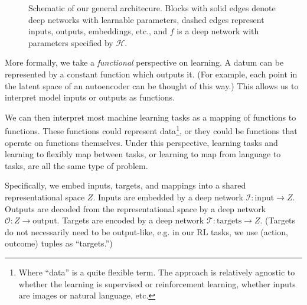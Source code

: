 \documentclass{article}
\begin{document}
\begin{figure}
\caption{Schematic of our general architecure. Blocks with solid edges denote deep networks with learnable parameters, dashed edges represent inputs, outputs, embeddings, etc., and $f$ is a deep network with parameters specified by $\mathcal{H}$.} \label{architecture_fig}
\end{figure}
More formally, we take a \emph{functional} perspective on learning. A datum can be represented by a constant function which outputs it. (For example, each point in the latent space of an autoencoder can be thought of this way.) This allows us to interpret model inputs or outputs as functions. \par
We can then interpret most machine learning tasks as a mapping of functions to functions. These functions could represent data\footnote{Where ``data'' is a quite flexible term. The approach is relatively agnostic to whether the learning is supervised or reinforcement learning, whether inputs are images or natural language, etc.}, or they could be functions that operate on functions themselves. Under this perspective, learning tasks and learning to flexibly map between tasks, or learning to map from language to tasks, are all the same type of problem. \par
Specifically, we embed inputs, targets, and mappings into a shared representational space $Z$. Inputs are embedded by a deep network $\mathcal{I}: \text{input} \rightarrow Z$. Outputs are decoded from the representational space by a deep network $\mathcal{O}: Z \rightarrow \text{output}$. Targets are encoded by a deep network $\mathcal{T}: \text{targets} \rightarrow Z$. (Targets do not necessarily need to be output-like, e.g. in our RL tasks, we use (action, outcome) tuples as ``targets.'') \par
\end{document}
